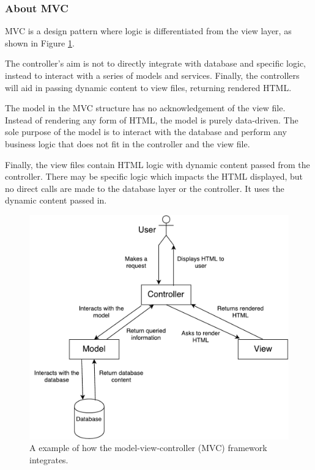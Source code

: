 \subsubsection{About MVC}
MVC is a design pattern where logic is differentiated from the view layer, as shown in Figure \ref{fig:mvc}.

The controller's aim is not to directly integrate with database and specific logic, instead to interact with a series of models and services. Finally, the controllers will aid in passing dynamic content to view files, returning rendered HTML.

The model in the MVC structure has no acknowledgement of the view file. Instead of rendering any form of HTML, the model is purely data-driven. The sole purpose of the model is to interact with the database and perform any business logic that does not fit in the controller and the view file.

Finally, the view files contain HTML logic with dynamic content passed from the controller. There may be specific logic which impacts the HTML displayed, but no direct calls are made to the database layer or the controller. It uses the dynamic content passed in.

\begin{figure}[H]
  \centering
  \includegraphics[scale=0.38]{images/MVC.pdf}
  \caption{A example of how the model-view-controller (MVC) framework integrates.}
  \label{fig:mvc}
\end{figure}

